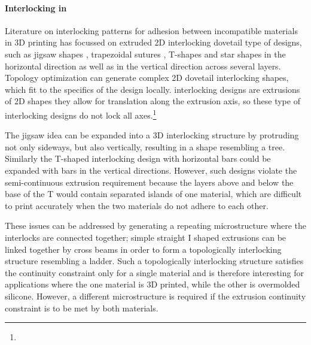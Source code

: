 

\paragraph{Interlocking in }

Literature on interlocking patterns for adhesion between incompatible materials in  3D printing has focussed on extruded 2D interlocking dovetail type of designs,
such as jigsaw shapes \cite{malik2017}, trapezoidal sutures \cite{Li2013}, T-shapes\cite{Ribeiro2019,mustafa2021development} and star shapes\cite{Wang2021} in the horizontal direction
as well as in the vertical direction across several layers\cite{debora2020}.
Topology optimization can generate complex 2D dovetail interlocking shapes, which fit to the specifics of the design locally\cite{aharoni2021}.
 interlocking designs are extrusions of 2D shapes they allow for translation along the extrusion axis, so these type of interlocking designs do not lock all axes.\footnote{}

The jigsaw idea can be expanded into a 3D interlocking structure by protruding not only sideways, but also vertically, resulting in a shape resembling a tree\cite{gouker2006manufacturing}.
Similarly the T-shaped interlocking design with horizontal bars could be expanded with bars in the vertical directions.
However, such designs violate the semi-continuous extrusion requirement because the layers above and below the base of the T would contain separated islands of one material, 
which are difficult to print accurately when the two materials do not adhere to each other.

These issues can be addressed by generating a repeating microstructure where the interlocks are connected together;
simple straight I shaped extrusions can be linked together by cross beams in order to form a topologically interlocking structure resembling a ladder\cite{Rossing2020}.
Such a topologically interlocking structure satisfies the continuity constraint only for a single material and is therefore interesting for applications where the one material is 3D printed, while the other is overmolded silicone.
However, a different microstructure is required if the extrusion continuity constraint is to be met by both materials.

